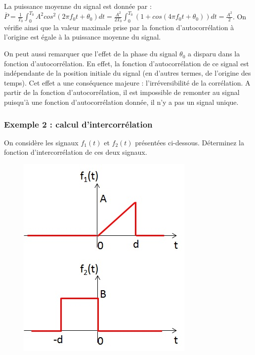 	La puissance moyenne du signal est donnée par : $\overline{P}=\frac{1}{T_{0}}\int_{0}^{T_{0}}A^{2}cos^{2}(2\pi f_{0}t+\theta_{0})dt=\frac{A^{2}}{2T_{0}}\int_{0}^{T_{0}}(1+cos(4\pi f_{0}t+\theta_{0}))dt=\frac{A^{2}}{2}$. On vérifie ainsi que la valeur maximale prise par la fonction d'autocorrélation à l'origine est égale à la puissance moyenne du signal.

	On peut aussi remarquer que l'effet de la phase du signal $\theta_{0}$ a disparu dans la fonction d'autocorrélation. En effet, la fonction d'autocorrélation de ce signal est indépendante de la position initiale du signal (en d'autres termes, de l'origine des temps). Cet effet a une conséquence majeure : l'irréversibilité de la corrélation. A partir de la fonction d'autocorrélation, il est impossible de remonter au signal puisqu'à une fonction d'autocorrélation donnée, il n'y a pas un signal unique.
	
	\vspace{0.5\baselineskip}
		
	
	\subsubsection{Exemple 2 : calcul d'intercorrélation}
	
	On considère les signaux $f_{1}(t)$ et $f_{2}(t)$ présentées ci-dessous. Déterminez la fonction d'intercorrélation de ces deux signaux.
	
	\begin{figure}[h!]
		\centering
		\includegraphics[scale=0.6]{images/Ex_intercorrelation.jpg}
	\end{figure}
	
